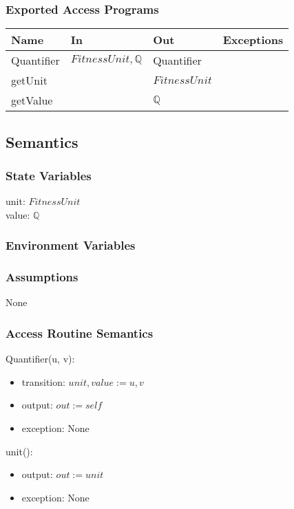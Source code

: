 \documentclass[12pt, titlepage]{article}
\begin{document}
\subsubsection{Exported Access Programs}

\begin{center}
	\begin{tabular}{p{2cm} p{4cm} p{4cm} p{2cm}}
		\hline
		\textbf{Name} & \textbf{In} & \textbf{Out} & \textbf{Exceptions} \\
		\hline
		Quantifier & $FitnessUnit, \mathbb{Q}$ & Quantifier &  \\
		getUnit &  & $FitnessUnit$ &  \\
		getValue &  & $\mathbb{Q}$ &  \\
		\hline
	\end{tabular}
\end{center}

\subsection{Semantics}

\subsubsection{State Variables}
unit: $FitnessUnit$ \\
value: $\mathbb{Q}$

\subsubsection{Environment Variables}

\subsubsection{Assumptions}
None

\subsubsection{Access Routine Semantics}

Quantifier(u, v):
\begin{itemize}
	\item transition: $unit, value := u, v$
	\item output: $out := self$
	\item exception: None
\end{itemize}

unit():
\begin{itemize}
	\item output: $out := unit$
	\item exception: None
\end{itemize}
\end{document}
